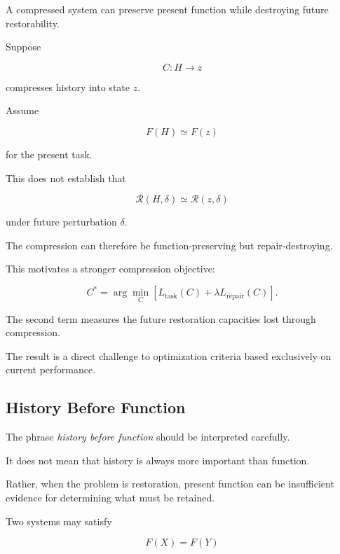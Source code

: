 \documentclass[11pt]{article}
\theoremstyle{remark}
\begin{document}
A compressed system can preserve present function while destroying future restorability.

Suppose

\begin{equation}
C:H\rightarrow z
\end{equation}

compresses history into state $z$.

Assume

\begin{equation}
F(H)\simeq F(z)
\end{equation}

for the present task.

This does not establish that

\begin{equation}
\mathcal{R}(H,\delta)
\simeq
\mathcal{R}(z,\delta)
\end{equation}

under future perturbation $\delta$.

The compression can therefore be function-preserving but repair-destroying.

This motivates a stronger compression objective:

\begin{equation}
C^\ast
=
\arg\min_C
\left[
L_{\mathrm{task}}(C)
+
\lambda L_{\mathrm{repair}}(C)
\right].
\end{equation}

The second term measures the future restoration capacities lost through compression.

The result is a direct challenge to optimization criteria based exclusively on current performance.

\subsection{History Before Function}

The phrase \emph{history before function} should be interpreted carefully.

It does not mean that history is always more important than function.

Rather, when the problem is restoration, present function can be insufficient evidence for determining what must be retained.

Two systems may satisfy

\begin{equation}
F(X)=F(Y)
\end{equation}
\end{document}

